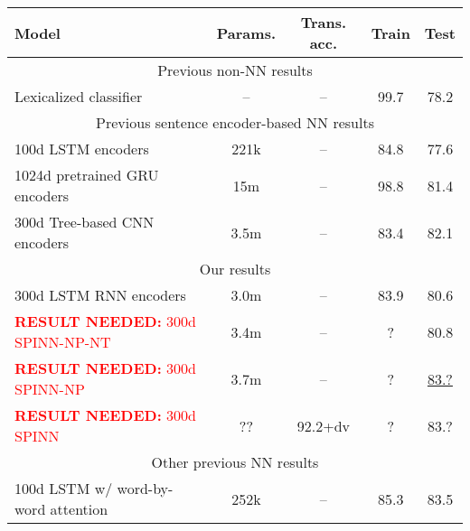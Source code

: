 \documentclass[11pt]{article}
\newcommand\result[1]{\textcolor{red}{\textbf{RESULT NEEDED:} #1}}
\begin{document}
\begin{table*}[t]
  \centering\small
  \begin{tabular}{lcccc} 
    \toprule
Model                   & Params.    & Trans. acc.  &   Train  &   Test \\
\midrule
\multicolumn{5}{c}{Previous non-NN results}\\
\midrule
Lexicalized classifier \citep{snli:emnlp2015}
                        & --                & --                    &   99.7   &   78.2      \\
\midrule
\multicolumn{5}{c}{Previous sentence encoder-based NN results}\\
\midrule
100d LSTM encoders \citep{snli:emnlp2015}
                        & 221k               & --               &   84.8   &   77.6      \\
1024d pretrained GRU encoders \citep{DBLP:journals/corr/VendrovKFU15}
                        & 15m                & --              &   98.8   &   81.4       \\
300d Tree-based CNN encoders \citep{mou2015recognizing}
                        & 3.5m                & --             &   83.4   &   82.1       \\
\midrule
\multicolumn{5}{c}{Our results}\\
\midrule
300d LSTM RNN encoders          & 3.0m                  & --                &   83.9      &   80.6       \\
\result{300d SPINN-NP-NT}   
                        & 3.4m                  & --                &   ?      &   80.8       \\
\result{300d SPINN-NP}
                        & 3.7m                  & --                &   ?      &   \underline{83.?}       \\
\result{300d SPINN }
                        & ??                  & 92.2+dv            &   ?    &   83.?      \\          
\midrule
\multicolumn{5}{c}{Other previous NN results}\\
\midrule
100d LSTM w/ word-by-word attention \citep{rocktaschel2015reasoning}
                        & 252k               & --              &   85.3   &   83.5       \\

\end{tabular}
\end{table*}
\end{document}
